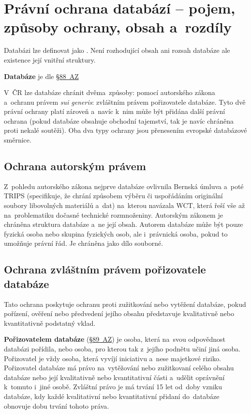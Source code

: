 \clearpage
\section{Právní ochrana databází -- pojem, způsoby ochrany, obsah a~rozdíly}

Databázi lze definovat jako \emph{}. Není rozhodující obsah ani rozsah databáze ale existence její vnitřní struktury.

\textbf{Databáze} je dle \href{https://www.zakonyprolidi.cz/cs/2000-121#p88}{§88~AZ} \emph{}

V~ČR lze databáze chránit dvěma~způsoby: pomocí autorského zákona a~ochranu právem \emph{sui generis}: zvláštním právem pořizovatele databáze. Tyto dvě právní ochrany platí zároveň a~navíc k~nim může být přidána další právní ochrana (pokud databáze obsahuje obchodní tajemství, tak je navíc chráněna proti nekalé soutěži). Oba dva typy ochrany jsou přenesením evropské databázové směrnice.

\subsection{Ochrana autorským právem}

Z~pohledu autorského zákona nejprve databáze ovlivnila Bernská úmluva a~poté TRIPS (specifikuje, že chrání způsobem výběru či uspořádáním originální soubory libovolných materiálů a~dat) na~kterou navázala WCT, která řeší vše až na~problematiku dočasné technické rozmnoženiny. Autorským zákonem je chráněna struktura databáze a~ne její obsah. Autorem databáze může být pouze fyzická osoba nebo skupina fyzických osob, ale i~právnická osoba, pokud to umožňuje právní řád. Je chráněna jako dílo souborné.

\subsection{Ochrana zvláštním právem pořizovatele databáze}

Tato ochrana poskytuje ochranu proti zužitkování nebo vytěžení databáze, pokud pořízení, ověření nebo předvedení jejího obsahu představuje kvalitativně nebo kvantitativně podstatný vklad.

\textbf{Pořizovatelem databáze} (\href{https://www.zakonyprolidi.cz/cs/2000-121#p89}{§89~AZ}) je osoba, která na~svou odpovědnost databázi pořídila, nebo osoba, pro kterou tak z~jejího podnětu učiní jiná osoba. Pořizovatel je vždy osoba, která vyvíjí iniciativu a~nese majetkové riziko. Pořizovatel databáze má právo na~vytěžování nebo zužitkovaní celého obsahu databáze nebo její kvalitativně nebo kvantitativní části a~udělit oprávnění k~tomuto i~jiné osobě. Zvláštní právo je má trvání 15 let od~doby vzniku databáze, kdy každé kvalitativní nebo kvantitativní přidaní do~databáze obnovuje dobu trvání tohoto práva.

